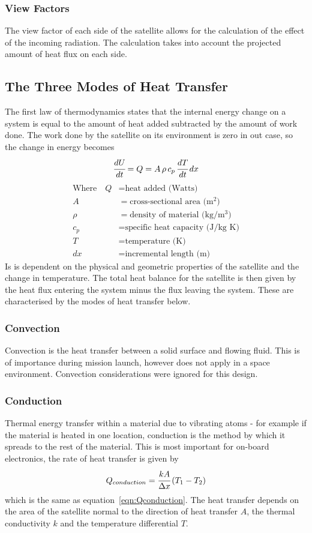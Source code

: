 \subsubsection{View Factors}
The view factor of each side of the satellite allows for the calculation of the effect of the incoming radiation. The calculation takes into account the projected amount of heat flux on each side.

\begin{figure}[H]
\end{figure}

\subsection{The Three Modes of Heat Transfer}
The first law of thermodynamics states that the internal energy change on a system is equal to the amount of heat added subtracted by the amount of work done. The work done by the satellite on its environment is zero in out case, so the change in energy becomes
\[ \cfrac{dU}{dt} = Q = A\,\rho\,c_p\,\cfrac{dT}{dt}\,dx \]
\noindent
\begin{align}
\text{Where}\quad Q &= \text{heat added (Watts)} \nonumber\\
A &= \text{cross-sectional area (m$^2$)} \nonumber\\
\rho &= \text{density of material (kg/m$^3$)} \nonumber\\
c_p &= \text{specific heat capacity (J/kg K)} \nonumber\\
T &= \text{temperature (K)} \nonumber\\
dx &= \text{incremental length (m)} \nonumber
\end{align}
Is is dependent on the physical and geometric properties of the satellite and the change in temperature. The total heat balance for the satellite is then given by the heat flux entering the system minus the flux leaving the system. These are characterised by the modes of heat transfer below.
\subsubsection{Convection}
Convection is the heat transfer between a solid surface and flowing fluid. This is of importance during mission launch, however does not apply in a space environment. Convection considerations were ignored for this design.
\subsubsection{Conduction}
Thermal energy transfer within a material due to vibrating atoms - for example if the material is heated in one location, conduction is the method by which it spreads to the rest of the material. This is most important for on-board electronics, the rate of heat transfer is given by 
\[ Q_{conduction} = \cfrac{kA}{\Delta x}\,(T_1-T_2) \]
\noindent
which is the same as equation~\ref{eqn:Qconduction}. The heat transfer depends on the area of the satellite normal to the direction of heat transfer $A$, the thermal conductivity $k$ and the temperature differential $T$.
